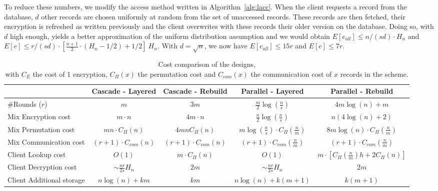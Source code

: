 \documentclass[USenglish,oneside,twocolumn]{article}
\begin{document}
To reduce these numbers, we modify the access method written in Algorithm~\ref{alg:lacc}. When the client requests a record from the database, $d$ other records are chosen uniformly at random from the set of unaccessed records. These records are then fetched, their encryption is refreshed as written previously and the client overwrites with these records their older version on the database. Doing so, with $d$ high enough, yields a better approximation of the uniform distribution assumption and we would obtain  $E[e_{all}]\leq n/(sd) \cdot H_n $ and $E[e] \leq {r/(sd)} \cdot \left [ \frac{n+1}{2}\cdot(H_n-1/2)+1/2 \right ] \ H_n$.
With $d=\sqrt n$, we now have $E[e_{all}]\leq 15 r$ and $E[e]\leq 7r$.

\begin{table}
\vspace{0pt}
\centering
\begin{tabular}{l *4c}
\toprule
    					& Cascade - Layered	 			& Cascade - Rebuild							& Parallel - Layered 						& Parallel - Rebuild\\
\midrule
\#Rounds ($r$) & $m$ & $3m$ & $\frac{m}{2} \log\left( \frac{n}{s}\right)$ &  $4m\log(n) +  m$ \\
Mix Encryption cost & $m \cdot  n$ & $4m  \cdot  n$ & $\frac{n}{2} \log\left (\frac{n}{s}\right)$ & $n(4\log(n) + 2) $ \\
Mix Permutation cost & $m n \cdot C_{\Pi}(n)$ & $4 m n C_{\Pi}(n)$ & $m \log\left (\frac{n}{s}\right)\cdot C_{\Pi}\left(\frac{n}{m}\right)$ & $8m\log(n) \cdot C_{\Pi}\left ( \frac{n}{m} \right )$ \\
Mix Communication cost & $(r+1) \cdot C_{com}(n)$ & $(r+1) \cdot C_{com}(n)$ & $(r+1) \cdot C_{com}\left(\frac{n}{m}\right)$ & $(r+1) \cdot C_{com}\left(\frac{n}{m}\right)$\\
Client Lookup cost & $O(1)$ & $m\cdot C_{\Pi}(n)$ & $O(1)$ & $m \cdot [C_{\Pi}\left ( \frac{n}{m}\right )h+ 2C_{\Pi}(n)]$\\
Client Decryption cost & $\sim \frac{nr}{2s} H_n$ & $2m$ & $\sim \frac{nr}{2s} H_n$ & $2m$\\
Client Additional storage & $n\log(n)+ k m$ & $km$ &$n\log(n)+ k (m+1)$ & $k(m+1)$ \\
\bottomrule
\end{tabular}
\centering
\caption{Cost comparison of the designs, \\ with $C_{E}$ the cost of 1 encryption, $C_{\Pi}(x)$ the permutation cost and $C_{com}(x)$ the communication cost of $x$ records in the scheme.}
\end{table}
\end{document}
